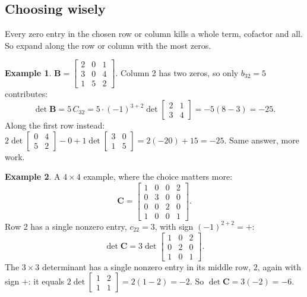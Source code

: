 \documentclass[11pt]{article}
\theoremstyle{plain}
\theoremstyle{definition}
\newtheorem{ex}{Example}[section]
\theoremstyle{remark}
\newcommand{\mt}[1]{\mathbf{#1}}
\begin{document}
\subsection{Choosing wisely}
Every zero entry in the chosen row or column kills a whole term, cofactor and
all. So expand along the row or column with the most zeros.

\begin{ex}
$\mt{B}=\begin{bmatrix}2&0&1\\3&0&4\\1&5&2\end{bmatrix}$. Column 2 has two zeros,
so only $b_{32}=5$ contributes:
\[
  \det\mt{B}=5\,C_{32}=5\cdot(-1)^{3+2}\det\begin{bmatrix}2&1\\3&4\end{bmatrix}
  =-5(8-3)=-25 .
\]
Along the first row instead:
$2\det\begin{bmatrix}0&4\\5&2\end{bmatrix}-0+1\det\begin{bmatrix}3&0\\1&5\end{bmatrix}
=2(-20)+15=-25$. Same answer, more work.
\end{ex}

\begin{ex}
A $4\times4$ example, where the choice matters more:
\[
  \mt{C}=\begin{bmatrix}1&0&0&2\\0&3&0&0\\0&0&2&0\\1&0&0&1\end{bmatrix}.
\]
Row 2 has a single nonzero entry, $c_{22}=3$, with sign $(-1)^{2+2}=+$:
\[
  \det\mt{C}=3\det\begin{bmatrix}1&0&2\\0&2&0\\1&0&1\end{bmatrix}.
\]
The $3\times3$ determinant has a single nonzero entry in its middle row, $2$,
again with sign $+$: it equals $2\det\begin{bmatrix}1&2\\1&1\end{bmatrix}=2(1-2)=-2$.
So $\det\mt{C}=3(-2)=-6$.
\end{ex}
\end{document}
